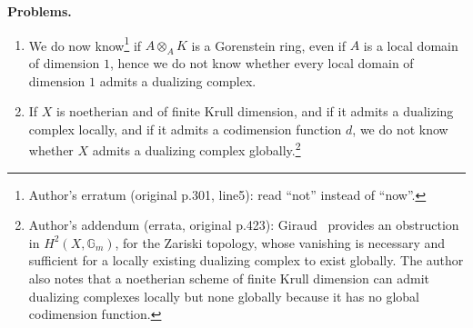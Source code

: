 \par\medskip\noindent\textbf{Problems.}
\begin{enumerate}
\item We do now know\footnote{Author's erratum (original p.301, line5): read ``not'' instead of ``now''.} if $\widehat{A}\otimes_A K$ is a Gorenstein ring, even if $A$ is a local domain of dimension $1$, hence we do not know whether every local domain of dimension $1$ admits a dualizing complex.
\item{}\label{prob:5.10.2} If $X$ is noetherian and of finite Krull dimension, and if it admits a dualizing complex locally, and if it admits a codimension function $d$, we do not know whether $X$ admits a dualizing complex globally.\footnote{Author's addendum (errata, original p.423): Giraud~\cite{6} provides an obstruction in $H^2(X,\mathbb{G}_m)$, for the Zariski topology, whose vanishing is necessary and sufficient for a locally existing dualizing complex to exist globally. The author also notes that a noetherian scheme of finite Krull dimension can admit dualizing complexes locally but none globally because it has no global codimension function.}
\end{enumerate}
\par\medskip
